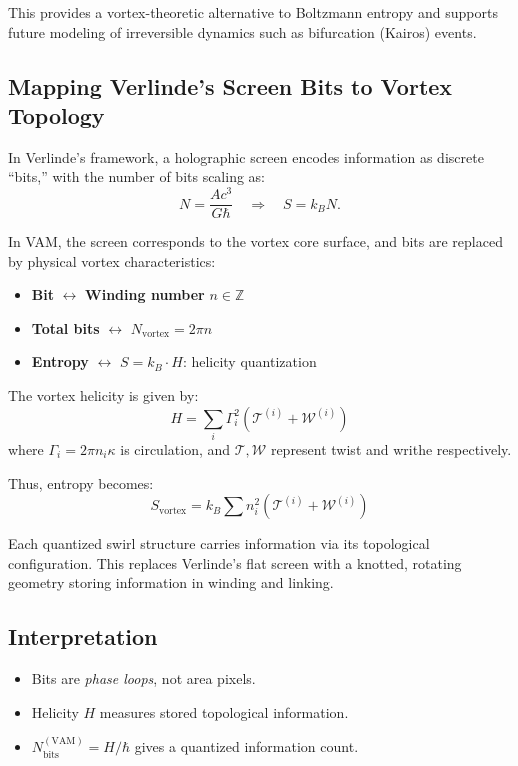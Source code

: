 \documentclass[12pt]{article}
\begin{document}
            This provides a vortex-theoretic alternative to Boltzmann entropy and supports future modeling of irreversible dynamics such as bifurcation (Kairos) events.

            \subsection{Mapping Verlinde's Screen Bits to Vortex Topology}
            In Verlinde's framework, a holographic screen encodes information as discrete ``bits,'' with the number of bits scaling as:
            \begin{equation}
            N = \frac{A c^3}{G \hbar} \quad \Rightarrow \quad S = k_B N.
            \end{equation}

            In VAM, the screen corresponds to the vortex core surface, and bits are replaced by physical vortex characteristics:
            \begin{itemize}
                \item \textbf{Bit} $\leftrightarrow$ \textbf{Winding number} $n \in \mathbb{Z}$
                \item \textbf{Total bits} $\leftrightarrow$ $N_\text{vortex} = 2\pi n$
                \item \textbf{Entropy} $\leftrightarrow$ $S = k_B \cdot H$: helicity quantization
            \end{itemize}

            The vortex helicity is given by:
            \begin{equation}
            H = \sum_i \Gamma_i^2 (\mathcal{T}^{(i)} + \mathcal{W}^{(i)})
            \end{equation}
            where $\Gamma_i = 2\pi n_i \kappa$ is circulation, and $\mathcal{T}, \mathcal{W}$ represent twist and writhe respectively.

            Thus, entropy becomes:
            \begin{equation}
            \boxed{
            S_\text{vortex} = k_B \sum n_i^2 (\mathcal{T}^{(i)} + \mathcal{W}^{(i)})
            }
            \end{equation}

            Each quantized swirl structure carries information via its topological configuration. This replaces Verlinde's flat screen with a knotted, rotating geometry storing information in winding and linking.

            \subsection*{Interpretation}
            \begin{itemize}
            \item Bits are \textit{phase loops}, not area pixels.
                \item Helicity $H$ measures stored topological information.
                \item $N_\text{bits}^{(\text{VAM})} = H / \hbar$ gives a quantized information count.
            \end{itemize}
\end{document}
